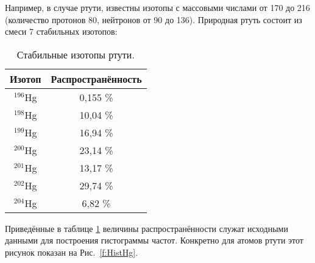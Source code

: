\documentclass[a5paper,openany]{book}
\begin{document}

Например, в случае ртути, известны изотопы с массовыми числами от 170 до 216 (количество протонов 80, нейтронов от 90 до 136).
Природная ртуть состоит из смеси 7 стабильных изотопов:

\begin{table}[h!]
	\centering
	\caption{Стабильные изотопы ртути.} 
	\medskip 
	\begin{tabular}{cc}
		Изотоп & Распространённость \\
		\hline
		$^{196}$Hg &  0,155 \% \\
		$^{198}$Hg & 10,04 \% \\
		$^{199}$Hg  & 16,94 \% \\
		$^{200}$Hg  & 23,14 \% \\
		$^{201}$Hg  &  13,17 \% \\
		$^{202}$Hg  &  29,74 \% \\
		$^{204}$Hg  &  6,82 \% \\
		\hline
	\end{tabular} 
	\label{Sulfur}
\end{table}		

Приведённые в таблице \ref{Sulfur} величины распространённости служат исходными данными для построения гистограммы частот. %
Конкретно для атомов ртути этот рисунок показан на Рис.~\ref{f:HistHg}.
\end{document}
